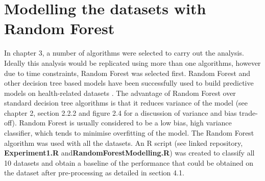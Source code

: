 \section{Modelling the datasets with Random Forest}
In chapter 3, a number of algorithms were selected to carry out the analysis. Ideally this analysis would be replicated using more than one algorithms, however due to time constraints, Random Forest was selected first. Random Forest and other decision tree based models have been successfully used to build predictive models on health-related datasets \citep{Dua:2014dz, AlWesabi:hx}. The advantage of Random Forest over standard decision tree algorithms is that it reduces variance of the model \citep{Liberman:2017wf, Ramchandani:2018vv} (see chapter 2, section 2.2.2 and figure 2.4 for a discussion of variance and bias trade-off). Random Forest is usually considered to be a low bias, high variance classifier, which tends to minimise overfitting of the model.\newline
The Random Forest algorithm was used with all the datasets.\newline
An R script (see linked repository, \textbf{Experiment1.R} and\textbf{RandomForestModelling.R}) was created to classify all 10 datasets and obtain a baseline of the performance that could be obtained on the dataset after pre-processing as detailed in section 4.1.\newline
